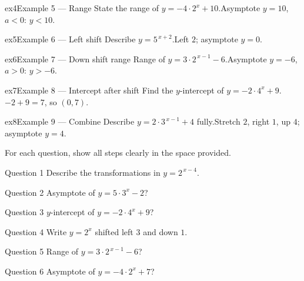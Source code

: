\documentclass[11pt]{article}
\begin{document}
\begin{example}{ex4}{Example 5 --- Range}
State the range of $y=-4\cdot2^{x}+10$.\soln Asymptote $y=10$, $a<0$: $y<10$.
\end{example}

\begin{example}{ex5}{Example 6 --- Left shift}
Describe $y=5^{\,x+2}$.\soln Left $2$; asymptote $y=0$.
\end{example}

\begin{example}{ex6}{Example 7 --- Down shift range}
Range of $y=3\cdot2^{\,x-1}-6$.\soln Asymptote $y=-6$, $a>0$: $y>-6$.
\end{example}

\begin{example}{ex7}{Example 8 --- Intercept after shift}
Find the $y$-intercept of $y=-2\cdot4^{x}+9$.\soln $-2+9=7$, so $(0,7)$.
\end{example}

\begin{example}{ex8}{Example 9 --- Combine}
Describe $y=2\cdot3^{\,x-1}+4$ fully.\soln Stretch $2$, right $1$, up $4$; asymptote $y=4$.
\end{example}

\clearpage
{}
For each question, show all steps clearly in the space provided.

\begin{qbox}{Question 1}
Describe the transformations in $y=2^{\,x-4}$.\workspace{2.4cm}
\end{qbox}

\begin{qbox}{Question 2}
Asymptote of $y=5\cdot3^{x}-2$?\workspace{2.4cm}
\end{qbox}

\begin{qbox}{Question 3}
$y$-intercept of $y=-2\cdot4^{x}+9$?\workspace{2.4cm}
\end{qbox}

\begin{qbox}{Question 4}
Write $y=2^{x}$ shifted left $3$ and down $1$.\workspace{2.4cm}
\end{qbox}

\begin{qbox}{Question 5}
Range of $y=3\cdot2^{\,x-1}-6$?\workspace{2.4cm}
\end{qbox}

\begin{qbox}{Question 6}
Asymptote of $y=-4\cdot2^{x}+7$?\workspace{2.4cm}
\end{qbox}
\end{document}
